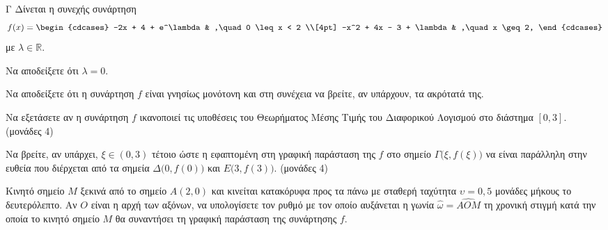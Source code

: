 \begin{thema}{Γ}
Δίνεται η συνεχής συνάρτηση
\[
f(x) =
\begin{cdcases}
-2x + 4 + e^\lambda & ,\quad 0 \leq x < 2 \\[4pt]
-x^2 + 4x - 3 + \lambda & ,\quad x \geq 2,
\end{cdcases}
\]
με $\lambda \in \mathbb{R}$.
\begin{erwthma}
    \item Να αποδείξετε ότι $\lambda = 0$. 

    \item Να αποδείξετε ότι η συνάρτηση $f$ είναι γνησίως μονότονη και στη συνέχεια να βρείτε, αν υπάρχουν, τα ακρότατά της. 

    \item
    \begin{alist}
        \item Να εξετάσετε αν η συνάρτηση $f$ ικανοποιεί τις υποθέσεις του Θεωρήματος Μέσης Τιμής του Διαφορικού Λογισμού στο διάστημα $[0, 3]$. \hfill (μονάδες 4)
        \item Να βρείτε, αν υπάρχει, $\xi \in (0, 3)$ τέτοιο ώστε η εφαπτομένη στη γραφική παράσταση της $f$ στο σημείο $\Gamma\bigl(\xi, f(\xi)\bigr)$ να είναι παράλληλη στην ευθεία που διέρχεται από τα σημεία $\Delta\bigl(0, f(0)\bigr)$ και $E\bigl(3, f(3)\bigr)$. \hfill (μονάδες 4)
    \end{alist}

    \item Κινητό σημείο $M$ ξεκινά από το σημείο $A(2, 0)$ και κινείται κατακόρυφα προς τα πάνω με σταθερή ταχύτητα $\upsilon = 0{,}5$ μονάδες μήκους το δευτερόλεπτο. Αν $O$ είναι η αρχή των αξόνων, να υπολογίσετε τον ρυθμό με τον οποίο αυξάνεται η γωνία $\hat{\omega} = \widehat{AOM}$ τη χρονική στιγμή κατά την οποία το κινητό σημείο $M$ θα συναντήσει τη γραφική παράσταση της συνάρτησης $f$. 
\end{erwthma}
\end{thema}

